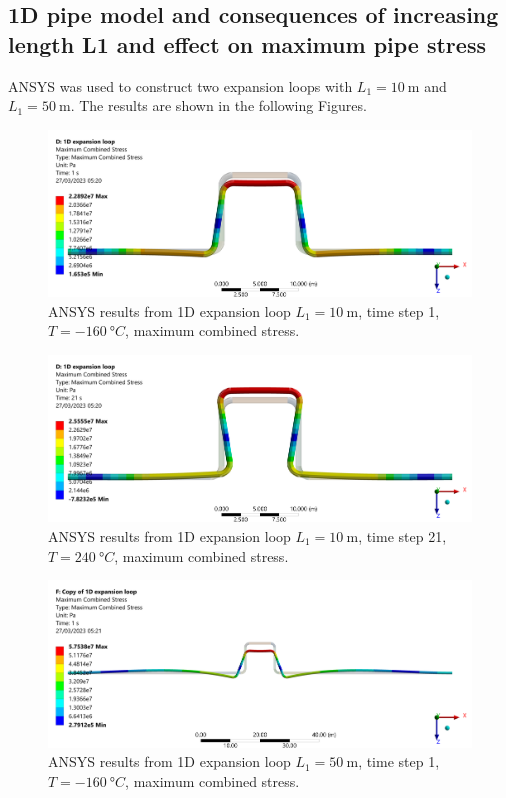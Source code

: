 \subsection{1D pipe model and consequences of increasing length L1 and effect on maximum pipe stress}
ANSYS was used to construct two expansion loops with $L_1 = \SI{10}{\meter}$ and $L_1 = \SI{50}{\meter}$. The results are shown in the following Figures.
\begin{figure}[H]
    \centering
    \includegraphics[width = \textwidth]{img/part2e-1.png}
    \caption{ANSYS results from 1D expansion loop $L_1 = \SI{10}{\meter}$, time step 1, $T = \SI{-160}{\degree C}$, maximum combined stress.}
\end{figure}
\begin{figure}[H]
    \centering
    \includegraphics[width = \textwidth]{img/part2e-2.png}
    \caption{ANSYS results from 1D expansion loop $L_1 = \SI{10}{\meter}$, time step 21, $T = \SI{240}{\degree C}$, maximum combined stress.}
\end{figure}
\begin{figure}[H]
    \centering
    \includegraphics[width = \textwidth]{img/part2e-3.png}
    \caption{ANSYS results from 1D expansion loop $L_1 = \SI{50}{\meter}$, time step 1, $T = \SI{-160}{\degree C}$, maximum combined stress.}
\end{figure}
